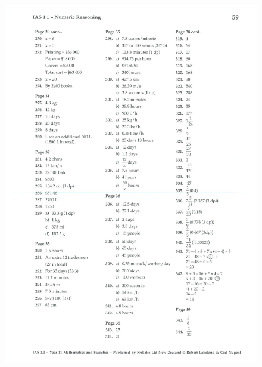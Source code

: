 \documentclass[a4paper,12pt]{article}
\begin{document}
\begin{figure}[!h]
	\centering
	\includegraphics[width=17cm]{Nulake_year10_forextension_ratio_sol2}
\end{figure}
\end{document}
